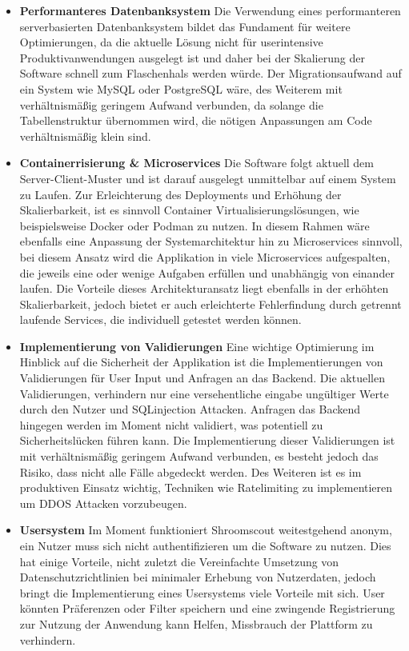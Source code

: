 \documentclass[../main.tex]{subfiles}
\begin{document}
\begin{itemize}

    \item \textbf{Performanteres Datenbanksystem}
        Die Verwendung eines performanteren serverbasierten Datenbanksystem bildet das Fundament für weitere Optimierungen, da die aktuelle Lösung nicht für userintensive
        Produktivanwendungen ausgelegt ist und daher bei der Skalierung der Software schnell zum Flaschenhals werden würde. Der Migrationsaufwand auf ein System wie MySQL oder PostgreSQL
        wäre, des Weiterem mit verhältnismäßig geringem Aufwand verbunden, da solange die Tabellenstruktur übernommen wird, die nötigen Anpassungen am Code verhältnismäßig klein sind. 

	\item \textbf{Containerrisierung \& Microservices}
	    Die Software folgt aktuell dem Server-Client-Muster und ist darauf ausgelegt unmittelbar auf einem System zu Laufen.
        Zur Erleichterung des Deployments und Erhöhung der Skalierbarkeit, ist es sinnvoll Container Virtualisierungslösungen, wie beispielsweise Docker oder Podman zu nutzen.
        In diesem Rahmen wäre ebenfalls eine Anpassung der Systemarchitektur hin zu Microservices sinnvoll, bei diesem Ansatz wird die Applikation in viele Microservices aufgespalten,
        die jeweils eine oder wenige Aufgaben erfüllen und unabhängig von einander laufen. Die Vorteile dieses Architekturansatz liegt ebenfalls in der erhöhten Skalierbarkeit, jedoch
        bietet er auch erleichterte Fehlerfindung durch getrennt laufende Services, die individuell getestet werden können.
        
    \item \textbf{Implementierung von Validierungen}
        Eine wichtige Optimierung im Hinblick auf die Sicherheit der Applikation ist die Implementierungen von Validierungen für User Input und Anfragen an das Backend.
        Die aktuellen Validierungen, verhindern nur eine versehentliche eingabe ungültiger Werte durch den Nutzer und SQLinjection Attacken. Anfragen das Backend hingegen werden
        im Moment nicht validiert, was potentiell zu Sicherheitslücken führen kann. Die Implementierung dieser Validierungen ist mit verhältnismäßig geringem Aufwand verbunden,
        es besteht jedoch das Risiko, dass nicht alle Fälle abgedeckt werden. Des Weiteren ist es im produktiven Einsatz wichtig, Techniken wie Ratelimiting zu implementieren um 
        DDOS Attacken vorzubeugen.
        
    \item \textbf{Usersystem}
        Im Moment funktioniert Shroomscout weitestgehend anonym, ein Nutzer muss sich nicht authentifizieren um die Software zu nutzen. Dies hat einige Vorteile, nicht zuletzt die
        Vereinfachte Umsetzung von Datenschutzrichtlinien bei minimaler Erhebung von Nutzerdaten, jedoch bringt die Implementierung eines Usersystems viele Vorteile mit sich.
        User könnten Präferenzen oder Filter speichern und eine zwingende Registrierung zur Nutzung der Anwendung kann Helfen, Missbrauch der Plattform zu verhindern.


\end{itemize}
\end{document}
